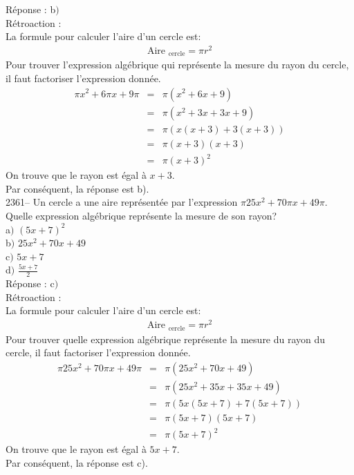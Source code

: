 \documentclass[letterpaper, 12pt]{article}
\begin{document}
R\'eponse : b$)$\\

R\'etroaction :\\
La formule pour calculer l'aire d'un cercle est:
\begin{eqnarray*}
 \textrm{Aire $_{\textrm{cercle}}$}=\pi r^{2}
\end{eqnarray*}
Pour trouver l'expression alg\'ebrique qui repr\'esente la mesure du rayon du cercle, il faut factoriser l'expression donn\'ee.
\begin{eqnarray*}
 \pi x^{2}+6\pi x+9\pi&=& \pi (x^{2}+6x+9)\\
&=& \pi (x^{2}+3x+3x+9)\\
&=& \pi (x(x+3)+3(x+3))\\
&=& \pi (x+3)(x+3)\\
&=& \pi (x+3)^{2}
\end{eqnarray*}
On trouve que le rayon est \'egal \`a $x+3$.\\
Par cons\'equent, la r\'eponse est b).\\

2361-- Un cercle a une aire repr\'esent\'ee par l'expression $\pi 25x^{2}+70\pi x+49\pi$. Quelle expression alg\'ebrique repr\'esente la mesure de son rayon?\\

a$)$ $(5x+7)^{2}$\\
b$)$ $25x^{2}+70x+49$\\
c$)$ $5x+7$\\
d$)$ $\frac{5x+7}{2}$\\

R\'eponse : c$)$\\

R\'etroaction :\\
La formule pour calculer l'aire d'un cercle est:
\begin{eqnarray*}
 \textrm{Aire $_{\textrm{cercle}}$}=\pi r^{2}
\end{eqnarray*}
Pour trouver quelle expression alg\'ebrique repr\'esente la mesure du rayon du cercle, il faut factoriser l'expression donn\'ee.
\begin{eqnarray*}
 \pi 25x^{2}+70\pi x+49\pi &=& \pi (25x^{2}+70x+49)\\
&=& \pi (25x^{2}+35x+35x+49)\\
&=& \pi (5x(5x+7)+7(5x+7))\\
&=& \pi (5x+7)(5x+7)\\
&=& \pi (5x+7)^{2}
\end{eqnarray*}
On trouve que le rayon est \'egal \`a $5x+7$.\\
Par cons\'equent, la r\'eponse est c).\\
\end{document}
